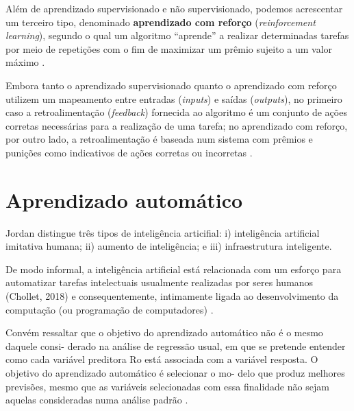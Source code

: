 \documentclass[
]{latex/krantz}
\renewenvironment{quote}{\begin{VF}}{\end{VF}}
\theoremstyle{definition}
\theoremstyle{definition}
\theoremstyle{definition}
\theoremstyle{definition}
\theoremstyle{remark}
\begin{document}
\begin{quote}
Além de aprendizado supervisionado e não supervisionado, podemos acrescentar um terceiro tipo, denominado \textbf{aprendizado com reforço} (\emph{reinforcement learning}), segundo o qual um algoritmo ``aprende'' a realizar determinadas tarefas por meio de repetições com o fim de maximizar um prêmio sujeito a um valor máximo \citep[p.~3]{MorettinSinger2022}.
\end{quote}

\begin{quote}
Embora tanto o aprendizado supervisionado quanto o aprendizado com reforço utilizem um mapeamento entre entradas (\emph{inputs}) e saídas (\emph{outputs}), no primeiro caso a retroalimentação (\emph{feedback}) fornecida ao algoritmo é um conjunto de ações corretas necessárias para a realização de uma tarefa; no aprendizado com reforço, por outro lado, a retroalimentação é baseada num sistema com prêmios e punições como indicativos de ações corretas ou incorretas \citep[p.~3]{MorettinSinger2022}.
\end{quote}

\hypertarget{aprendizado-automuxe1tico}{%
\section{Aprendizado automático}\label{aprendizado-automuxe1tico}}

Jordan \citep[2019 \emph{apud}][p.~4]{MorettinSinger2022} distingue três tipos de inteligência articifial: i) inteligência artificial imitativa humana; ii) aumento de inteligência; e iii) infraestrutura inteligente.

\begin{quote}
De modo informal, a inteligência artificial está relacionada com um esforço para automatizar tarefas intelectuais usualmente realizadas por seres humanos (Chollet, 2018) e consequentemente, intimamente ligada ao desenvolvimento da computação (ou programação de computadores) \citep[p.~4]{MorettinSinger2022}.
\end{quote}

\begin{quote}
Convém ressaltar que o objetivo do aprendizado automático não é o mesmo daquele consi- derado na análise de regressão usual, em que se pretende entender como cada variável preditora Ro está associada com a variável resposta. O objetivo do aprendizado automático é selecionar o mo- delo que produz melhores previsões, mesmo que as variáveis selecionadas com essa finalidade não sejam aquelas consideradas numa análise padrão \citep[p.~5]{MorettinSinger2022}.
\end{quote}
\end{document}
